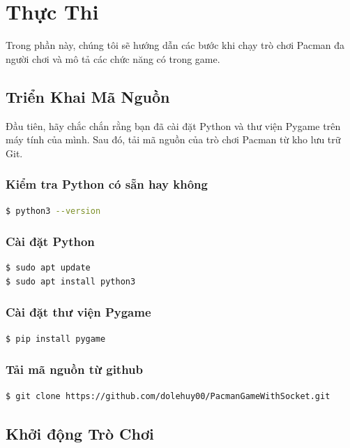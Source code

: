 \documentclass[a4paper]{article}
\begin{document}
\section{Thực Thi}

Trong phần này, chúng tôi sẽ hướng dẫn các bước khi chạy trò chơi Pacman đa người chơi và mô tả các chức năng có trong game.

\subsection{Triển Khai Mã Nguồn}

Đầu tiên, hãy chắc chắn rằng bạn đã cài đặt Python và thư viện Pygame trên máy tính của mình. Sau đó, tải mã nguồn của trò chơi Pacman từ kho lưu trữ Git.

\subsubsection{Kiểm tra Python có sẵn hay không}
\begin{lstlisting}[language=bash]
$ python3 --version
\end{lstlisting}

\subsubsection{Cài đặt Python}
\begin{lstlisting}[language=bash]
$ sudo apt update
$ sudo apt install python3
\end{lstlisting}

\subsubsection{Cài đặt thư viện Pygame}
\begin{lstlisting}[language=bash]
$ pip install pygame
\end{lstlisting}

\subsubsection{Tải mã nguồn từ github}
\begin{lstlisting}[language=bash]
$ git clone https://github.com/dolehuy00/PacmanGameWithSocket.git
\end{lstlisting}


\subsection{Khởi động Trò Chơi}
\end{document}
